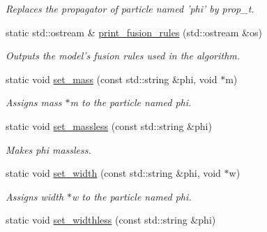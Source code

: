 \begin{DoxyCompactItemize}
\begin{DoxyCompactList}\small\item\em Replaces the propagator of particle named 'phi' by prop\-\_\-t. \end{DoxyCompactList}\item 
\hypertarget{a00370_acb0ac734ee049874616f1660013d9c52}{static std\-::ostream \& \hyperlink{a00370_acb0ac734ee049874616f1660013d9c52}{print\-\_\-fusion\-\_\-rules} (std\-::ostream \&os)}\label{a00370_acb0ac734ee049874616f1660013d9c52}

\begin{DoxyCompactList}\small\item\em Outputs the model's fusion rules used in the algorithm. \end{DoxyCompactList}\item 
\hypertarget{a00370_acbaaea84018bd272a5e50ff5a8a16d59}{static void \hyperlink{a00370_acbaaea84018bd272a5e50ff5a8a16d59}{set\-\_\-mass} (const std\-::string \&phi, void $\ast$m)}\label{a00370_acbaaea84018bd272a5e50ff5a8a16d59}

\begin{DoxyCompactList}\small\item\em Assigns mass $\ast$m to the particle named phi. \end{DoxyCompactList}\item 
\hypertarget{a00370_a75ccd0d0b23effc40e91ce86b480442a}{static void \hyperlink{a00370_a75ccd0d0b23effc40e91ce86b480442a}{set\-\_\-massless} (const std\-::string \&phi)}\label{a00370_a75ccd0d0b23effc40e91ce86b480442a}

\begin{DoxyCompactList}\small\item\em Makes phi massless. \end{DoxyCompactList}\item 
\hypertarget{a00370_ae79c4efd782a898b3e5248968f5d6238}{static void \hyperlink{a00370_ae79c4efd782a898b3e5248968f5d6238}{set\-\_\-width} (const std\-::string \&phi, void $\ast$w)}\label{a00370_ae79c4efd782a898b3e5248968f5d6238}

\begin{DoxyCompactList}\small\item\em Assigns width $\ast$w to the particle named phi. \end{DoxyCompactList}\item 
\hypertarget{a00370_a5af701e8e6e12a44184ea6e7b699c6d0}{static void \hyperlink{a00370_a5af701e8e6e12a44184ea6e7b699c6d0}{set\-\_\-widthless} (const std\-::string \&phi)}\label{a00370_a5af701e8e6e12a44184ea6e7b699c6d0}


\end{DoxyCompactItemize}
